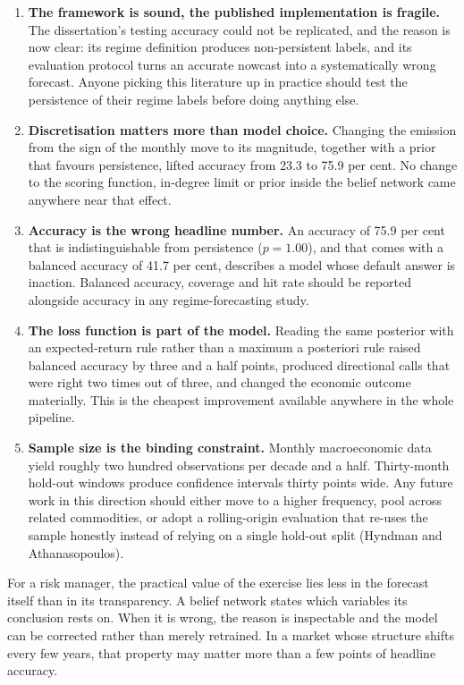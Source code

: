 \documentclass[11pt,a4paper]{article}
\begin{document}
\begin{enumerate}
\item \textbf{The framework is sound, the published implementation is fragile.} The dissertation's
testing accuracy could not be replicated, and the reason is now clear: its regime definition
produces non-persistent labels, and its evaluation protocol turns an accurate nowcast into a
systematically wrong forecast. Anyone picking this literature up in practice should test the
persistence of their regime labels before doing anything else.
\item \textbf{Discretisation matters more than model choice.} Changing the emission from the sign
of the monthly move to its magnitude, together with a prior that favours persistence, lifted
accuracy from 23.3 to 75.9 per cent. No change to the scoring function, in-degree limit or prior
inside the belief network came anywhere near that effect.
\item \textbf{Accuracy is the wrong headline number.} An accuracy of 75.9 per cent that is
indistinguishable from persistence ($p = 1.00$), and that comes with a balanced accuracy of 41.7
per cent, describes a model whose default answer is inaction. Balanced accuracy, coverage and hit
rate should be reported alongside accuracy in any regime-forecasting study.
\item \textbf{The loss function is part of the model.} Reading the same posterior with an
expected-return rule rather than a maximum a posteriori rule raised balanced accuracy by three and
a half points, produced directional calls that were right two times out of three, and changed the
economic outcome materially. This is the cheapest improvement available anywhere in the whole
pipeline.
\item \textbf{Sample size is the binding constraint.} Monthly macroeconomic data yield roughly two
hundred observations per decade and a half. Thirty-month hold-out windows produce confidence
intervals thirty points wide. Any future work in this direction should either move to a higher
frequency, pool across related commodities, or adopt a rolling-origin evaluation that re-uses the
sample honestly instead of relying on a single hold-out split (Hyndman and Athanasopoulos).
\end{enumerate}

For a risk manager, the practical value of the exercise lies less in the forecast itself than in
its transparency. A belief network states which variables its conclusion rests on. When it is
wrong, the reason is inspectable and the model can be corrected rather than merely retrained. In
a market whose structure shifts every few years, that property may matter more than a few points
of headline accuracy.
\end{document}
